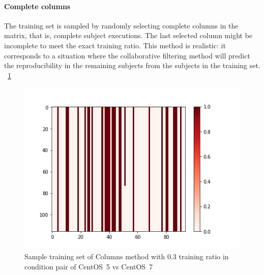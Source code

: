 \documentclass[10pt, conference, compsocconf]{IEEEtran}
\begin{document}
\paragraph{Complete columns}
The training set is sampled by randomly selecting complete columns in
the matrix, that is, complete subject executions. The last selected
column might be incomplete to meet the exact training ratio. This
method is realistic: it corresponds to a situation where the
collaborative filtering method will predict the reproducibility in the
remaining subjects from the subjects in the training set. ~\ref{fig:Columns-Sample-Training-set}
\begin{figure}
  \includegraphics[width=\columnwidth]{figures/5vs7_columns_03_training}
  \caption{Sample training set of Columns method with 0.3 training ratio in condition pair of CentOS~5 vs CentOS~7}
  \label{fig:Columns-Sample-Training-set}
\end{figure}
\end{document}
